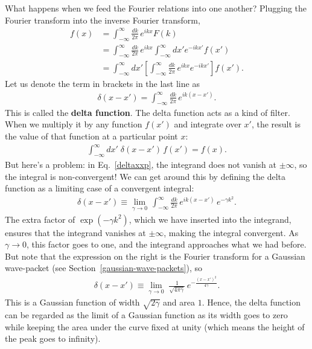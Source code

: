\documentclass[10pt,a4paper]{article}
\begin{document}
What happens when we feed the Fourier relations into one another?
Plugging the Fourier transform into the inverse Fourier transform,
\begin{align}
  f(x) &= \int_{-\infty}^\infty \frac{dk}{2\pi} \, e^{ikx} F(k) \\
  &= \int_{-\infty}^\infty \frac{dk}{2\pi} \, e^{ikx} \int_{-\infty}^\infty dx' e^{-ikx'} f(x')\\
  &= \int_{-\infty}^\infty dx' \left[ \int_{-\infty}^\infty \frac{dk}{2\pi} \, e^{ikx}  e^{-ikx'} \right] f(x').
\end{align}
Let us denote the term in brackets in the last line as
\begin{align}
  \delta(x-x') = \int_{-\infty}^\infty \frac{dk}{2\pi} \, e^{ik(x-x')}.
  \label{deltaxxp}
\end{align}
This is called the \textbf{delta function}. The delta function acts as
a kind of filter. When we multiply it by any function $f(x')$ and
integrate over $x'$, the result is the value of that function at a
particular point $x$:
\begin{align}
  \int_{-\infty}^\infty dx'\; \delta(x-x')\, f(x') = f(x).
\end{align}
But here's a problem: in Eq.~\eqref{deltaxxp}, the integrand does not
vanish at $\pm \infty$, so the integral is non-convergent!  We can get
around this by defining the delta function as a limiting case of a
convergent integral:
\begin{align}
  \delta(x-x') \equiv \lim_{\gamma \rightarrow 0} \, \int_{-\infty}^\infty \frac{dk}{2\pi} \, e^{ik(x-x')} \, e^{-\gamma k^2}.
\end{align}
The extra factor of $\exp(-\gamma k^2)$, which we have inserted into
the integrand, ensures that the integrand vanishes at $\pm \infty$,
making the integral convergent. As $\gamma \rightarrow 0$, this factor
goes to one, and the integrand approaches what we had before. But note
that the expression on the right is the Fourier transform for a
Gaussian wave-packet (see Section~\ref{gaussian-wave-packets}), so
\begin{align}
  \delta(x-x') \equiv \lim_{\gamma \rightarrow 0} \; \frac{1}{\sqrt{4\pi\gamma}} \, e^{-\frac{(x-x')^2}{4\gamma}}.
\end{align}
This is a Gaussian function of width $\sqrt{2\gamma}$ and area $1$.
Hence, the delta function can be regarded as the limit of a Gaussian
function as its width goes to zero while keeping the area under the
curve fixed at unity (which means the height of the peak goes to
infinity).
\end{document}
